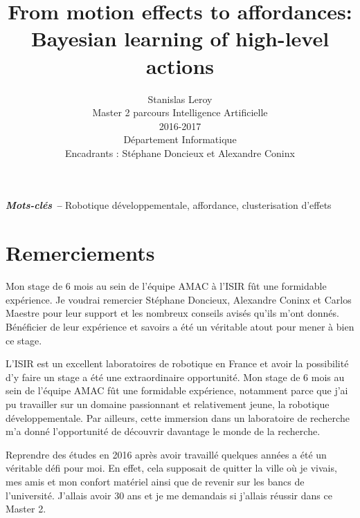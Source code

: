 \documentclass{llncs}
\providecommand{\keywords}[1]{\textbf{\textit{Mots-clés --}} #1}
\begin{document}
\title{From motion effects to affordances: Bayesian learning of high-level actions}

\author{Stanislas Leroy\\
   Master 2 parcours Intelligence Artificielle\\
   2016-2017\\
   Département Informatique\\
   Encadrants : Stéphane Doncieux et Alexandre Coninx}

\maketitle

\keywords{Robotique développementale, affordance, clusterisation d'effets}


\section*{Remerciements}

Mon stage de 6 mois au sein de l'équipe AMAC à l'ISIR fût une formidable expérience. Je voudrai remercier Stéphane Doncieux, Alexandre Coninx et Carlos Maestre pour leur support et les nombreux conseils avisés qu'ils m'ont donnés.
Bénéficier de leur expérience et savoirs a été un véritable atout pour mener à bien ce stage.

L'ISIR est un excellent laboratoires de robotique en France et avoir la possibilité d'y faire un stage a été une extraordinaire opportunité. Mon stage de 6 mois au sein de l'équipe AMAC fût une formidable expérience, notamment parce que j'ai pu travailler sur un domaine passionnant et relativement jeune, la robotique développementale. Par ailleurs,  cette immersion dans un laboratoire de recherche m'a donné l'opportunité de découvrir davantage le monde de la recherche.

Reprendre des études en 2016 après avoir travaillé quelques années a été un véritable défi pour moi. En effet, cela supposait de quitter la ville où je vivais, mes amis et mon confort matériel ainsi que de revenir sur les bancs de l'université. J'allais avoir 30 ans et je me demandais si j'allais réussir dans ce Master 2.
\end{document}

